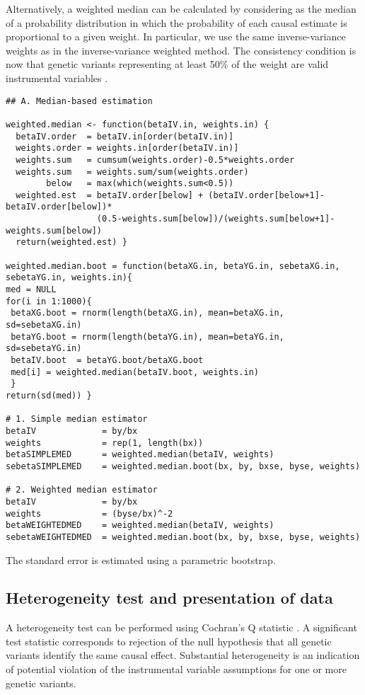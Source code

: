 \documentclass[a4paper,12pt]{article} %
\begin{document}
Alternatively, a weighted median can be calculated by considering as the median of a probability distribution in which the probability of each causal estimate is proportional to a given weight. In particular, we use the same inverse-variance weights as in the inverse-variance weighted method. The consistency condition is now that genetic variants representing at least 50\% of the weight are valid instrumental variables \citep{bowden2015median}.

\begin{lstlisting}
## A. Median-based estimation

weighted.median <- function(betaIV.in, weights.in) {
  betaIV.order  = betaIV.in[order(betaIV.in)]
  weights.order = weights.in[order(betaIV.in)]
  weights.sum   = cumsum(weights.order)-0.5*weights.order
  weights.sum   = weights.sum/sum(weights.order)
        below   = max(which(weights.sum<0.5))
  weighted.est  = betaIV.order[below] + (betaIV.order[below+1]-betaIV.order[below])*
                  (0.5-weights.sum[below])/(weights.sum[below+1]-weights.sum[below])
  return(weighted.est) }

weighted.median.boot = function(betaXG.in, betaYG.in, sebetaXG.in, sebetaYG.in, weights.in){
med = NULL
for(i in 1:1000){
 betaXG.boot = rnorm(length(betaXG.in), mean=betaXG.in, sd=sebetaXG.in)
 betaYG.boot = rnorm(length(betaYG.in), mean=betaYG.in, sd=sebetaYG.in)
 betaIV.boot  = betaYG.boot/betaXG.boot
 med[i] = weighted.median(betaIV.boot, weights.in)
 }
return(sd(med)) }

# 1. Simple median estimator
betaIV             = by/bx
weights            = rep(1, length(bx))
betaSIMPLEMED      = weighted.median(betaIV, weights)
sebetaSIMPLEMED    = weighted.median.boot(bx, by, bxse, byse, weights)

# 2. Weighted median estimator
betaIV             = by/bx
weights            = (byse/bx)^-2
betaWEIGHTEDMED    = weighted.median(betaIV, weights)
sebetaWEIGHTEDMED  = weighted.median.boot(bx, by, bxse, byse, weights)
\end{lstlisting}

The standard error is estimated using a parametric bootstrap.

\clearpage

\subsection{Heterogeneity test and presentation of data}
A heterogeneity test can be performed using Cochran's Q statistic \citep{greco2015}. A significant test statistic corresponds to rejection of the null hypothesis that all genetic variants identify the same causal effect. Substantial heterogeneity is an indication of potential violation of the instrumental variable assumptions for one or more genetic variants.
\end{document}
